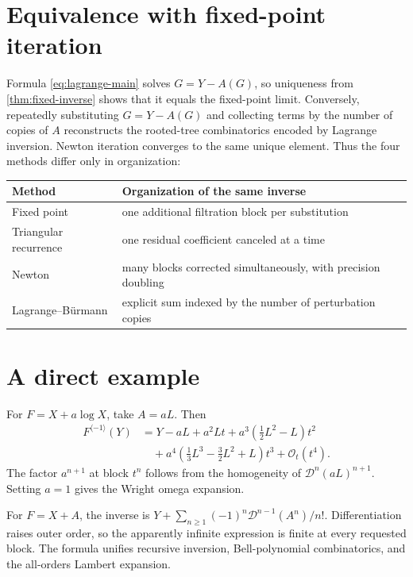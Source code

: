 \documentclass[11pt,oneside]{book}
\theoremstyle{definition}
\theoremstyle{remark}
\newcommand{\D}{\mathcal D}
\newcommand{\bigO}{\mathcal O}
\newcommand{\compinv}{^{\langle-1\rangle}}
\begin{document}
\section{Equivalence with fixed-point iteration}
Formula \eqref{eq:lagrange-main} solves
$G=Y-A(G)$, so uniqueness from \cref{thm:fixed-inverse} shows that it equals
the fixed-point limit.  Conversely, repeatedly substituting
$G=Y-A(G)$ and collecting terms by the number of copies of $A$ reconstructs
the rooted-tree combinatorics encoded by Lagrange inversion.  Newton iteration
converges to the same unique element.  Thus the four methods differ only in
organization:
\begin{center}
\begin{tabularx}{0.95\textwidth}{@{}lX@{}}
\toprule
Method & Organization of the same inverse \\
\midrule
Fixed point & one additional filtration block per substitution \\
Triangular recurrence & one residual coefficient canceled at a time \\
Newton & many blocks corrected simultaneously, with precision doubling \\
Lagrange--B\"urmann & explicit sum indexed by the number of perturbation copies \\
\bottomrule
\end{tabularx}
\end{center}

\section{A direct example}
For $F=X+a\log X$, take $A=aL$.  Then
\begin{align*}
 F\compinv(Y)
 &=Y-aL+a^2Lt
 +a^3\left(\frac12L^2-L\right)t^2\\
 &\quad+a^4\left(\frac13L^3-\frac32L^2+L\right)t^3
 +\bigO_t(t^4).
\end{align*}
The factor $a^{n+1}$ at block $t^n$ follows from the homogeneity of
$\D^{n}(aL)^{n+1}$.  Setting $a=1$ gives the Wright omega expansion.

\begin{summarybox}
For $F=X+A$, the inverse is
$Y+\sum_{n\ge1}(-1)^n\D^{n-1}(A^n)/n!$.  Differentiation raises outer order,
so the apparently infinite expression is finite at every requested block.
The formula unifies recursive inversion, Bell-polynomial combinatorics, and
the all-orders Lambert expansion.
\end{summarybox}
\end{document}
